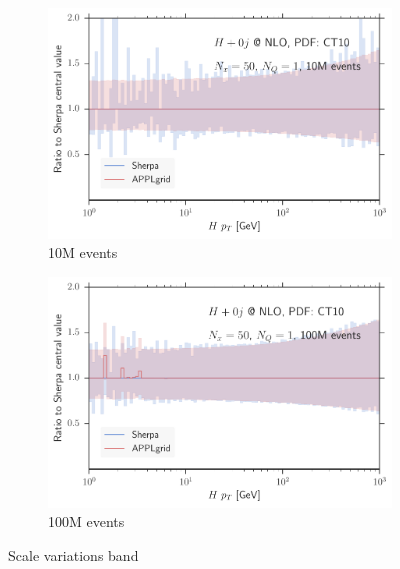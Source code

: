 %
\begin{figure}
\centering
\begin{subfigure}[]{0.49\textwidth}
	\includegraphics[width=\textwidth]{images/scalesvar_band_hpt_10M.pdf}
	\caption{10M events}
\end{subfigure}
\hfill
\begin{subfigure}[]{0.49\textwidth}
	\includegraphics[width=\textwidth]{images/scalesvar_band_hpt_100M.pdf}
	\caption{100M events}
\end{subfigure}
\caption{Scale variations band}
\end{figure}
%
